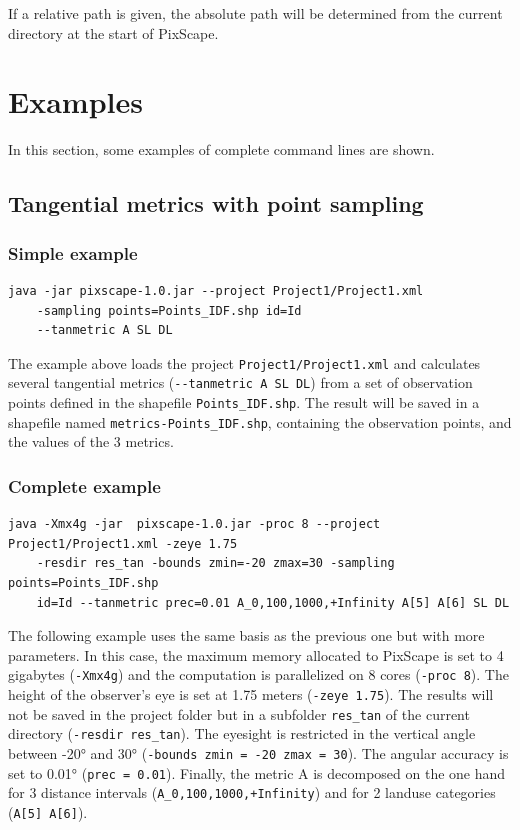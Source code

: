 \documentclass{report}
\begin{document}
If a relative path is given, the absolute path will be determined from the current directory at the start of PixScape.


\section{Examples}

In this section, some examples of complete command lines are shown.

\subsection{Tangential metrics with point sampling}
\subsubsection{Simple example}
\begin{Verbatim}
java -jar pixscape-1.0.jar --project Project1/Project1.xml 
	-sampling points=Points_IDF.shp id=Id 
	--tanmetric A SL DL
\end{Verbatim}

The example above loads the project \verb|Project1/Project1.xml| and calculates several tangential metrics (\verb|--tanmetric A SL DL|) from a set of observation points defined in the shapefile \verb|Points_IDF.shp|. The result will be saved in a shapefile named \verb|metrics-Points_IDF.shp|, containing the observation points, and the values of the 3 metrics.

\subsubsection{Complete example}
\begin{Verbatim}
java -Xmx4g -jar  pixscape-1.0.jar -proc 8 --project Project1/Project1.xml -zeye 1.75
	-resdir res_tan -bounds zmin=-20 zmax=30 -sampling points=Points_IDF.shp 
	id=Id --tanmetric prec=0.01 A_0,100,1000,+Infinity A[5] A[6] SL DL
\end{Verbatim}

The following example uses the same basis as the previous one but with more parameters. In this case, the maximum memory allocated to PixScape is set to 4 gigabytes (\verb|-Xmx4g|) and the computation is parallelized on 8 cores (\verb|-proc 8|). The height of the observer's eye is set at 1.75 meters (\verb|-zeye 1.75|). The results will not be saved in the project folder but in a subfolder \verb|res_tan| of the current directory (\verb|-resdir res_tan|). The eyesight is restricted in the vertical angle between -20° and 30° (\verb|-bounds zmin = -20 zmax = 30|). The angular accuracy is set to 0.01° (\verb|prec = 0.01|). Finally, the metric A is decomposed on the one hand for 3 distance intervals (\verb|A_0,100,1000,+Infinity|) and for 2 landuse categories (\verb|A[5] A[6]|).
\end{document}
